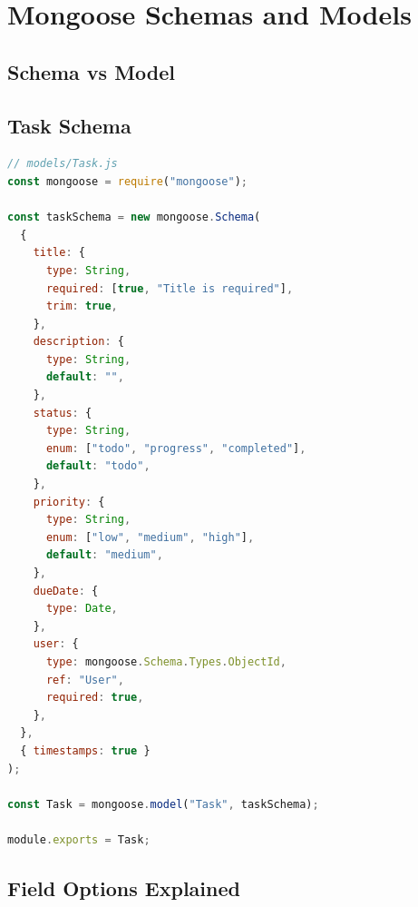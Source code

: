 \chapter{Mongoose Schemas and Models}

\section{Schema vs Model}


\section{Task Schema}

\begin{lstlisting}[language=JavaScript]
// models/Task.js
const mongoose = require("mongoose");

const taskSchema = new mongoose.Schema(
  {
    title: {
      type: String,
      required: [true, "Title is required"],
      trim: true,
    },
    description: {
      type: String,
      default: "",
    },
    status: {
      type: String,
      enum: ["todo", "progress", "completed"],
      default: "todo",
    },
    priority: {
      type: String,
      enum: ["low", "medium", "high"],
      default: "medium",
    },
    dueDate: {
      type: Date,
    },
    user: {
      type: mongoose.Schema.Types.ObjectId,
      ref: "User",
      required: true,
    },
  },
  { timestamps: true }
);

const Task = mongoose.model("Task", taskSchema);

module.exports = Task;
\end{lstlisting}

\section{Field Options Explained}

